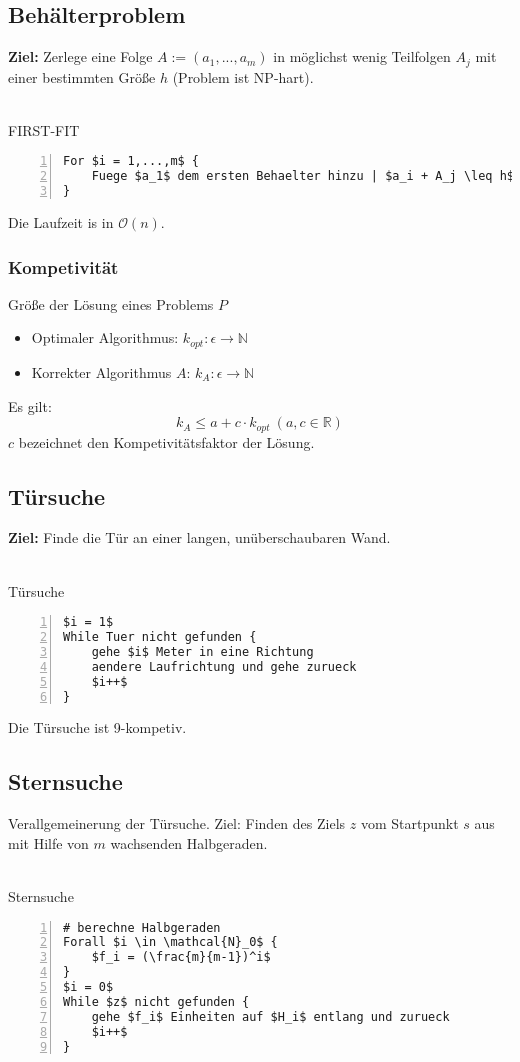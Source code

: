 \subsection{Behälterproblem}
\textbf{Ziel:} Zerlege eine Folge \(A := (a_1,...,a_m)\) in möglichst wenig Teilfolgen \(A_j\) mit einer bestimmten Größe \(h\) (Problem ist NP-hart).
\\\\
\begin{minipage}{\textwidth}
FIRST-FIT
\begin{lstlisting}[frame=single,numbers=left,mathescape]
For $i = 1,...,m$ {
	Fuege $a_1$ dem ersten Behaelter hinzu | $a_i + A_j \leq h$
}
\end{lstlisting}
\end{minipage}
Die Laufzeit is in \(\mathcal{O}(n)\).

\subsubsection{Kompetivität}
Größe der Lösung eines Problems \(P\)
\begin{itemize}
	\item Optimaler Algorithmus: \(k_{opt}: \epsilon \rightarrow \mathbb{N}\)
	\item Korrekter Algorithmus \(A\): \(k_A: \epsilon \rightarrow \mathbb{N}\)
\end{itemize}
Es gilt:
\[k_A \leq a+c\cdot k_{opt}~(a,c \in \mathbb{R})\]
\(c\) bezeichnet den Kompetivitätsfaktor der Lösung.


\subsection{Türsuche}
\textbf{Ziel:} Finde die Tür an einer langen, unüberschaubaren Wand.
\\\\
\begin{minipage}{\textwidth}
Türsuche
\begin{lstlisting}[frame=single,numbers=left,mathescape]
$i = 1$
While Tuer nicht gefunden {
	gehe $i$ Meter in eine Richtung
	aendere Laufrichtung und gehe zurueck
	$i++$
}
\end{lstlisting}
\end{minipage}
Die Türsuche ist 9-kompetiv.


\subsection{Sternsuche}
Verallgemeinerung der Türsuche. Ziel: Finden des Ziels \(z\) vom Startpunkt \(s\) aus mit Hilfe von \(m\) wachsenden Halbgeraden.
\\\\
\begin{minipage}{\textwidth}
Sternsuche
\begin{lstlisting}[frame=single,numbers=left,mathescape]
# berechne Halbgeraden
Forall $i \in \mathcal{N}_0$ {
	$f_i = (\frac{m}{m-1})^i$
}
$i = 0$
While $z$ nicht gefunden {
	gehe $f_i$ Einheiten auf $H_i$ entlang und zurueck
	$i++$
}
\end{lstlisting}
\end{minipage}


